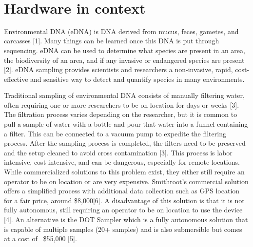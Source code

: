\documentclass[11pt, letterpaper]{article}
\begin{document}
\begin{flushleft}
\begin{tabu}

\\\hline
\end{tabu}
\end{flushleft}



\newpage
\section{Hardware in context}

Environmental DNA (eDNA) is DNA derived from mucus, feces, gametes, and carcasses [1]. Many things can be learned once this DNA is put through sequencing. eDNA can be used to determine what species are present in an area, the biodiversity of an area, and if any invasive or endangered species are present [2]. eDNA sampling provides scientists and researchers a non-invasive, rapid, cost-effective and sensitive way to detect and quantify species in many environments.  
 
Traditional sampling of environmental DNA consists of manually filtering water, often requiring one or more researchers to be on location for days or weeks [3]. The filtration process varies depending on the researcher, but it is common to pull a sample of water with a bottle and pour that water into a funnel containing a filter. This can be connected to a vacuum pump to expedite the filtering process. After the sampling process is completed, the filters need to be preserved and the setup cleaned to avoid cross contamination [3]. This process is labor intensive, cost intensive, and can be dangerous, especially for remote locations. While commercialized solutions to this problem exist, they either still require an operator to be on location or are very expensive. Smithroot’s commercial solution offers a simplified process with additional data collection such as GPS location for a fair price, around \$8,000[6]. A disadvantage of this solution is that it is not fully autonomous, still requiring an operator to be on location to use the device [4]. An alternative is the DOT Sampler which is a fully autonomous solution that is capable of multiple samples (20+ samples) and is also submersible but comes at a cost of ~\$55,000 [5]. 
\end{document}
